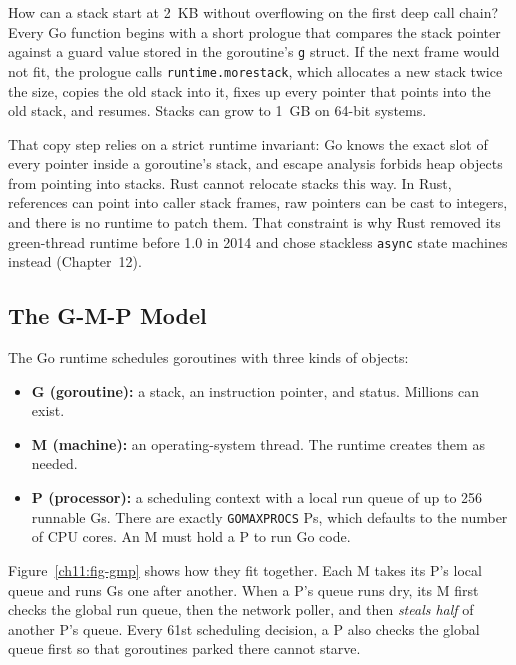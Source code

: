 How can a stack start at 2~KB without overflowing on the first deep call chain? Every Go function begins with a short prologue that compares the stack pointer against a guard value stored in the goroutine's \texttt{g} struct. If the next frame would not fit, the prologue calls \texttt{runtime.morestack}, which allocates a new stack twice the size, copies the old stack into it, fixes up every pointer that points into the old stack, and resumes. Stacks can grow to 1~GB on 64-bit systems.

That copy step relies on a strict runtime invariant: Go knows the exact slot of every pointer inside a goroutine's stack, and escape analysis forbids heap objects from pointing into stacks. Rust cannot relocate stacks this way. In Rust, references can point into caller stack frames, raw pointers can be cast to integers, and there is no runtime to patch them. That constraint is why Rust removed its green-thread runtime before 1.0 in 2014 and chose stackless \texttt{async} state machines instead (Chapter~12).

\subsection{The G-M-P Model}

The Go runtime schedules goroutines with three kinds of objects:
\begin{itemize}
  \item \textbf{G (goroutine):} a stack, an instruction pointer, and status. Millions can exist.
  \item \textbf{M (machine):} an operating-system thread. The runtime creates them as needed.
  \item \textbf{P (processor):} a scheduling context with a local run queue of up to 256 runnable Gs. There are exactly \texttt{GOMAXPROCS} Ps, which defaults to the number of CPU cores. An M must hold a P to run Go code.
\end{itemize}

Figure~\ref{ch11:fig-gmp} shows how they fit together. Each M takes its P's local queue and runs Gs one after another. When a P's queue runs dry, its M first checks the global run queue, then the network poller, and then \emph{steals half} of another P's queue. Every 61st scheduling decision, a P also checks the global queue first so that goroutines parked there cannot starve.

